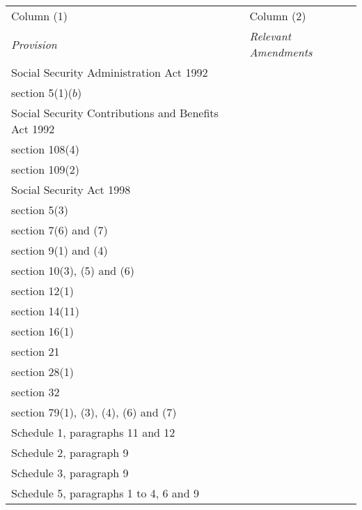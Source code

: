 \documentclass[12pt,a4paper]{article}
\begin{document}
{\footnotesize

\begin{longtable}{p{181.94467pt}p{184.07935pt}}
\hline
Column (1)	& Column (2)\\
\itshape Provision	& \itshape Relevant Amendments\\
\hline
\endhead
\hline
\endlastfoot
Social Security Administration Act 1992\\
\hspace{1em}section 5(1)($b$) \\
Social Security Contributions and Benefits Act 1992\\
\hspace{1em}section 108(4)\\
\hspace{1em}section 109(2)\\
Social Security Act 1998\\
\hspace{1em}section 5(3)\\
\hspace{1em}section 7(6) and (7)\\
\hspace{1em}section 9(1) and (4)\\
\hspace{1em}section 10(3), (5) and (6)\\
\hspace{1em}section 12(1)\\
\hspace{1em}section 14(11)\\
\hspace{1em}section 16(1)\\
\hspace{1em}section 21\\
\hspace{1em}section 28(1)\\
\hspace{1em}section 32\\
\hspace{1em}section 79(1), (3), (4), (6) and (7)\\
\hspace{1em}Schedule 1, paragraphs 11 and 12\\
\hspace{1em}Schedule 2, paragraph 9\\
\hspace{1em}Schedule 3, paragraph 9\\
\hspace{1em}Schedule 5, paragraphs 1 to 4, 6 and 9\\

\end{longtable}}
\end{document}
